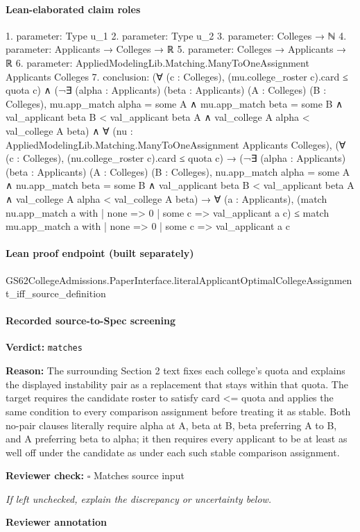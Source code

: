 \documentclass[10pt]{article}
\newcommand{\reviewerbox}{%
  \par\noindent\fbox{\parbox{0.96\linewidth}{\rule{0pt}{0.38in}}}\par
}
\newcommand{\reviewmatch}[1]{%
  \par\noindent\textbf{Reviewer check:} $\square$\; #1\par
  \noindent\emph{If left unchecked, explain the discrepancy or uncertainty below.}\par
}
\begin{document}
\paragraph{Lean-elaborated claim roles}\begin{ReviewVerbatim}
1. parameter: Type u_1
2. parameter: Type u_2
3. parameter: Colleges → ℕ
4. parameter: Applicants → Colleges → ℝ
5. parameter: Colleges → Applicants → ℝ
6. parameter: AppliedModelingLib.Matching.ManyToOneAssignment Applicants Colleges
7. conclusion: (∀ (c : Colleges), (mu.college_roster c).card ≤ quota c) ∧
  (¬∃ (alpha : Applicants) (beta : Applicants) (A : Colleges) (B : Colleges),
        mu.app_match alpha = some A ∧
          mu.app_match beta = some B ∧
            val_applicant beta B < val_applicant beta A ∧ val_college A alpha < val_college A beta) ∧
    ∀ (nu : AppliedModelingLib.Matching.ManyToOneAssignment Applicants Colleges),
      (∀ (c : Colleges), (nu.college_roster c).card ≤ quota c) →
        (¬∃ (alpha : Applicants) (beta : Applicants) (A : Colleges) (B : Colleges),
              nu.app_match alpha = some A ∧
                nu.app_match beta = some B ∧
                  val_applicant beta B < val_applicant beta A ∧ val_college A alpha < val_college A beta) →
          ∀ (a : Applicants),
            (match nu.app_match a with
              | none => 0
              | some c => val_applicant a c) ≤
              match mu.app_match a with
              | none => 0
              | some c => val_applicant a c
\end{ReviewVerbatim}

\paragraph{Lean proof endpoint (built separately)}\begin{ReviewVerbatim}
GS62CollegeAdmissions.PaperInterface.literalApplicantOptimalCollegeAssignment_iff_source_definition
\end{ReviewVerbatim}

\paragraph{Recorded source-to-Spec screening}
\textbf{Verdict:} \texttt{matches}
\\
{\raggedright
\textbf{Reason:} The surrounding Section 2 text fixes each college's quota and explains the displayed instability pair as a replacement that stays within that quota.\allowbreak{} The target requires the candidate roster to satisfy card <= quota and applies the same condition to every comparison assignment before treating it as stable.\allowbreak{} Both no-\allowbreak{}pair clauses literally require alpha at A, beta at B, beta preferring A to B, and A preferring beta to alpha;\allowbreak{} it then requires every applicant to be at least as well off under the candidate as under each such stable comparison assignment.\allowbreak{}
\par}
\reviewmatch{Matches source input}
\noindent\textbf{Reviewer annotation}\par
\reviewerbox
\clearpage
\hypertarget{source-claim-f836a3d18eeab599}{}
\end{document}

